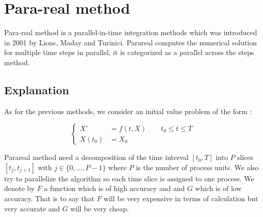 \section{Para-real method}
	
Para-real method is a parallel-in-time integration methods which was introduced in 2001 by Lions, Maday and Turinici. Parareal computes the numerical solution for multiple time steps in parallel, it is categorized as a parallel across the steps method.

\subsection{Explanation}

As for the previous methods, we consider an initial value problem of the form :

$$\left\{\begin{aligned}
    X'&=f(t,X) \qquad t_0\le t\le T \\
    X(t_0)&=X_0
\end{aligned}\right.$$

\noindent Parareal method need a decomposition of the time interval $[t_0,T]$ into $P$ slices $[t_j,t_{j+1}]$ with  $j\in\{0,\dots,P-1\}$ where $P$ is the number of process units. We also try to parallelize the algorithm so each time slice is assigned to one process. We denote by $F$ a function which is of high accuracy and and $G$ which is of low accuracy. That is to say that $F$ will be very expensive in terms of calculation but very accurate and $G$ will be very cheap.  \\

